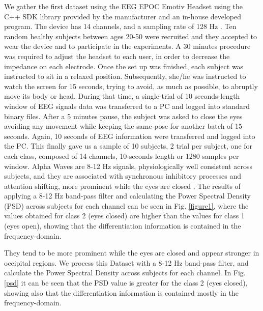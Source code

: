 We gather the first dataset using the EEG EPOC Emotiv Headset using the C++ SDK library provided by the manufacturer and an in-house developed program. The device has 14 channels, and a sampling rate of 128 Hz \cite{c11}. Ten random healthy subjects between ages 20-50 were recruited and they accepted to wear the device and to participate in the experiments.  A 30 minutes procedure was required to adjust the headset to each user, in order to decrease the impedance on each electrode. Once the set up was finished, each subject was instructed to sit in a relaxed position. Subsequently, she/he was instructed to watch the screen for 15 seconds, trying to avoid, as much as possible, to abruptly move its body or head.  During that time, a single-trial of 10 seconds-length window of EEG signals data was transferred to a PC and logged into standard binary files. After a 5 minutes pause, the subject was asked to close the eyes avoiding any movement while keeping the same pose for another batch of 15 seconds.  Again, 10 seconds of EEG information were transferred and logged into the PC. This finally gave us a sample of 10 subjects,  2 trial per subject, one for each class, composed of 14 channels, 10-seconds length or 1280 samples per window. Alpha Waves are 8-12 Hz signals, physiologically well consistent across subjects, and they are associated with synchronous inhibitory processes and attention shifting, more prominent while the eyes are closed \cite{c3}. The results of applying a 8-12 Hz band-pass filter and calculating the Power Spectral Density (PSD) across subjects for each channel can be seen in Fig. \ref{figure1}, where the values obtained for class 2 (eyes closed) are higher than the values for class 1 (eyes open), showing that the differentiation information is contained in the frequency-domain.
 
They tend to be more prominent while the eyes are closed and appear stronger in occipital regions. We process this Dataset with a 8-12 Hz band-pass filter, and calculate the Power Spectral Density across subjects for each channel.  In Fig. \ref{psd} it can be seen that the PSD value is greater for the class 2 (eyes closed), showing also that the differentiation information is contained mostly in the frequency-domain.




